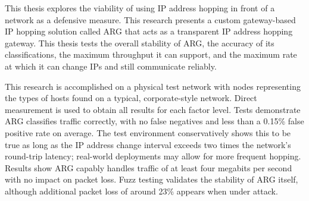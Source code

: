 \par This thesis explores the viability of using \ac{IP} address hopping in front of a network as a defensive measure. This research presents a custom gateway-based \ac{IP} hopping solution called \ac{ARG} that acts as a transparent \ac{IP} address hopping gateway. This thesis tests the overall stability of \ac{ARG}, the accuracy of its classifications, the maximum throughput it can support, and the maximum rate at which it can change \acp{IP} and still communicate reliably.

\par This research is accomplished on a physical test network with nodes representing the types of hosts found on a typical, corporate-style network. Direct measurement is used to obtain all results for each factor level. Tests demonstrate \ac{ARG} classifies traffic correctly, with no false negatives and less than a 0.15\% false positive rate on average. The test environment conservatively shows this to be true as long as the \ac{IP} address change interval exceeds two times the network's round-trip latency; real-world deployments may allow for more frequent hopping. Results show \ac{ARG} capably handles traffic of at least four megabits per second with no impact on packet loss. Fuzz testing validates the stability of \ac{ARG} itself, although additional packet loss of around 23\% appears when under attack.

\acresetall

